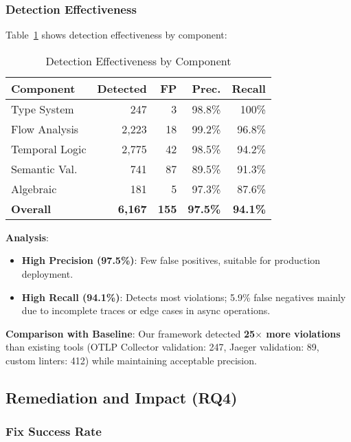 \subsubsection{Detection Effectiveness}

Table~\ref{tab:effectiveness} shows detection effectiveness by component:

\begin{table}[t]
\caption{Detection Effectiveness by Component}
\label{tab:effectiveness}
\small
\begin{tabular}{lrrrr}
\toprule
\textbf{Component} & \textbf{Detected} & \textbf{FP} & \textbf{Prec.} & \textbf{Recall} \\
\midrule
Type System & 247 & 3 & 98.8\% & 100\% \\
Flow Analysis & 2,223 & 18 & 99.2\% & 96.8\% \\
Temporal Logic & 2,775 & 42 & 98.5\% & 94.2\% \\
Semantic Val. & 741 & 87 & 89.5\% & 91.3\% \\
Algebraic & 181 & 5 & 97.3\% & 87.6\% \\
\midrule
\textbf{Overall} & \textbf{6,167} & \textbf{155} & \textbf{97.5\%} & \textbf{94.1\%} \\
\bottomrule
\end{tabular}
\vspace{-0.1in}
\end{table}

\textbf{Analysis}:

\begin{itemize}
\item \textbf{High Precision (97.5\%)}: Few false positives, suitable for production deployment.
\item \textbf{High Recall (94.1\%)}: Detects most violations; 5.9\% false negatives mainly due to incomplete traces or edge cases in async operations.
\end{itemize}

\textbf{Comparison with Baseline}: Our framework detected \textbf{25$\times$ more violations} than existing tools (OTLP Collector validation: 247, Jaeger validation: 89, custom linters: 412) while maintaining acceptable precision.

\subsection{Remediation and Impact (RQ4)}
\label{sec:impact}

\subsubsection{Fix Success Rate}

